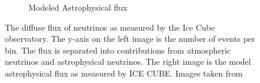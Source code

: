 \begin{figure}
\begin{subfigure}[b]{0.5\textwidth}
        \caption{Modeled Astrophysical flux}
    \end{subfigure}
    \caption{The diffuse flux of neutrinos as measured by the Ice Cube observatory. The y-axis on the left image is the number of events per bin.  The flux is separated into contributions from atmospheric neutrinos and astrophysical neutrinos. The right image is the model astrophysical flux as measured by ICE CUBE. Images taken from \cite{Abbasi_2022} }
    \label{fig:flux_neutrinos}
\end{figure}


